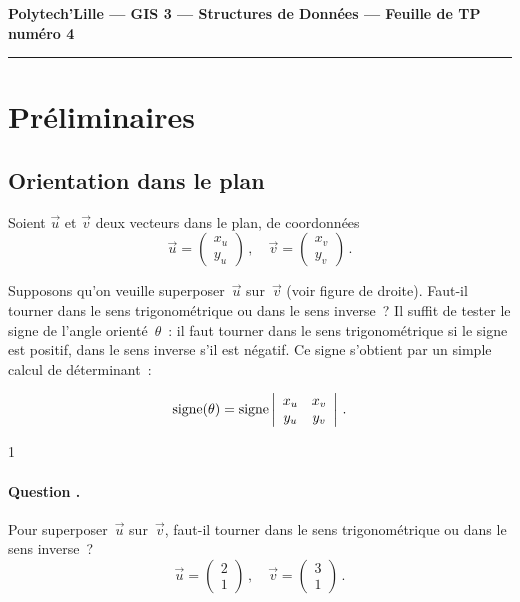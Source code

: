 \documentclass[11pt]{article}
\newcounter{question_counter}
\newcommand{\question}{\addtocounter{question_counter}1 %
    \paragraph{\bf Question \arabic{question_counter}.}}
\newcounter{points_counter}
\newcounter{section_points_counter}
\begin{document}
\begin{center}
{\bf Polytech'Lille --- GIS 3 --- Structures de Données --- Feuille de TP numéro 4}
 
\end{center}
\medskip
\hrule
 
\section{Préliminaires}

\subsection{Orientation dans le plan}

Soient $\vec u$ et $\vec v$ deux vecteurs 
dans le plan, de coordonnées
$$\vec u = \left(\begin{array}{c} x_u \\ y_u\end{array}\right)\,,\quad
  \vec v = \left(\begin{array}{c} x_v \\ y_v\end{array}\right)\,.$$
Supposons qu'on veuille superposer~$\vec u$ sur~$\vec v$ (voir figure
de droite).
Faut-il tourner dans le sens trigonométrique ou dans le sens inverse~?
Il suffit de tester le signe de l'angle orienté~$\theta$~: il faut
tourner dans le sens trigonométrique si le signe est positif, dans
le sens inverse s'il est négatif. Ce signe s'obtient par un simple
calcul de déterminant~:

$$\mathop{\mbox{\rm signe}}(\theta) =
  \mathop{\mbox{\rm signe}} \left|\begin{array}{cc} x_u & x_v \\ y_u & y_v 
                                \end{array}\right|\,.$$

\question
Pour superposer~$\vec u$ sur~$\vec v$, faut-il tourner dans le
sens trigonométrique ou dans le sens inverse~?
$$\vec u = \left(\begin{array}{c} 2 \\ 1\end{array}\right)\,,\quad
  \vec v = \left(\begin{array}{c} 3 \\ 1\end{array}\right)\,.$$
\end{document}
